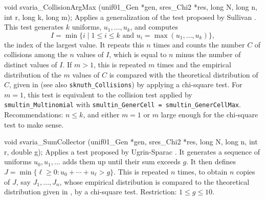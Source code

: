 void svaria_CollisionArgMax (unif01_Gen *gen, sres_Chi2 *res,
                             long N, long n, int r, long k, long m);
\endcode
 \tab
  Applies a generalization of the test proposed by Sullivan \cite{rSUL93a}.
  This test generates $k$ uniforms, $u_1,\dots,u_k$, and computes
   $$
     I = \min \Big\{ i \mid 1\le i\le k \mbox{ and }
          u_i = \max (u_1,\dots,u_k) \Big\},
   $$
  the index of the largest value.
  It repeats this $n$ times and  counts the number $C$ of collisions
  among the $n$ values of $I$, which is equal to   
  $n$ minus the number of distinct values of $I$.
  If $m > 1$, this is repeated $m$ times and the empirical distribution 
  of the $m$ values of $C$ is compared with the theoretical distribution of
  $C$, given in \cite{rKNU98a} (see also {\tt sknuth\_Collisions})
  by applying a chi-square test.
  For $m=1$, this test is equivalent to the collision test applied by
  {\tt smultin\_Multinomial} with
  {\tt smultin\_GenerCell = smultin\_GenerCellMax}.
  Recommendations: $n \le k$, and either $m=1$ or $m$ 
  large enough for the chi-square test to make sense.
 \endtab
\code


void svaria_SumCollector (unif01_Gen *gen, sres_Chi2 *res,
                          long N, long n, int r, double g);
\endcode
 \tab Applies a test proposed by
  Ugrin-Sparac \cite{rUGR91a}.
  It generates a sequence of uniforms $u_0,u_1,\dots$ adds them up
  until their sum exceeds $g$.  It then defines 
  $J = \min\{\ell\ge 0 : u_0 + \cdots + u_{\ell} > g \}$.
  This is repeated $n$ times, to obtain $n$ copies of $J$, say
  $J_1,\dots,J_n$, whose empirical distribution is compared to the
  theoretical distribution given in \cite{rUGR91a}, by a chi-square test.
   Restriction: $1 \le g \le 10$.
 \endtab
\code


